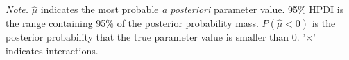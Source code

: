 \clearpage
\makeatletter
\efloat@restorefloats
\makeatother


\begin{appendix}
\section{}
\begin{center}
\begin{ThreePartTable}

\begin{TableNotes}[para]
\normalsize{\textit{Note.} $\hat{\mu}$ indicates the most probable \textit{a posteriori} parameter value. 95\% HPDI is the range containing 95\% of the posterior probability mass. $P(\hat{\mu}<0)$ is the posterior probability that the true parameter value is smaller than 0. '$\times$' indicates interactions.}
\end{TableNotes}

\small{

}
\end{ThreePartTable}
\end{center}
\end{appendix}
